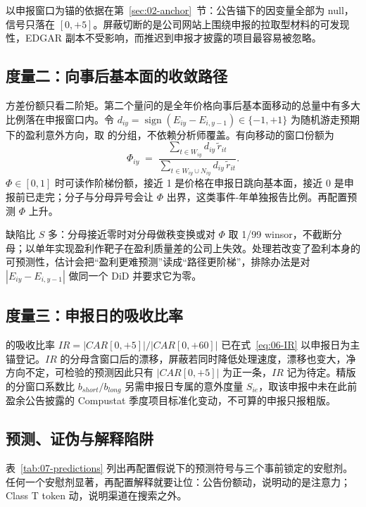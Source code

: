 \documentclass[a4paper,11pt]{ctexart}
\begin{document}
以申报窗口为锚的依据在第~\ref{sec:02-anchor}~节：公告锚下的因变量全部为 null，信号只落在 $[0,+5]$。屏蔽切断的是公司网站上围绕申报的拉取型材料的可发现性，EDGAR 副本不受影响，而推迟到申报才披露的项目最容易被忽略\citep{linekrasovteoh2020}。

\subsection{度量二：向事后基本面的收敛路径}\label{sec:07-conv}

方差份额只看二阶矩。第二个量问的是全年价格向事后基本面移动的总量中有多大比例落在申报窗口内。令 $d_{iy}=\operatorname{sign}(E_{iy}-E_{i,y-1})\in\{-1,+1\}$ 为随机游走预期下的盈利意外方向，取 \citet{ballbrown1968} 的分组，不依赖分析师覆盖。有向移动的窗口份额为
\begin{equation}\label{eq:07-conv}
\Phi_{iy} \;=\; \frac{\sum_{t\in W_{iy}} d_{iy}\,\tilde r_{it}}{\sum_{t\in W_{iy}\cup N_{iy}} d_{iy}\,\tilde r_{it}} .
\end{equation}
$\Phi\in[0,1]$ 时可读作阶梯份额，接近 1 是价格在申报日跳向基本面，接近 0 是申报前已走完；分子与分母异号会让 $\Phi$ 出界，这类事件-年单独报告比例。再配置预测 $\Phi$ 上升。

缺陷比 $S$ 多：分母接近零时对分母做秩变换或对 $\Phi$ 取 1/99 winsor，不截断分母；以单年实现盈利作靶子在盈利质量差的公司上失效。处理若改变了盈利本身的可预测性，估计会把“盈利更难预测”读成“路径更阶梯”，排除办法是对 $|E_{iy}-E_{i,y-1}|$ 做同一个 DiD 并要求它为零。

\subsection{度量三：申报日的吸收比率}\label{sec:07-ir}

\citet{dellavignapollet2009} 的吸收比率 $IR=|CAR[0,+5]|/|CAR[0,+60]|$ 已在式~\eqref{eq:06-IR} 以申报日为主锚登记。$IR$ 的分母含窗口后的漂移，屏蔽若同时降低处理速度，漂移也变大，净方向不定，可检验的预测因此只有 $|CAR[0,+5]|$ 为正一条，$IR$ 记为待定。精版的分窗口系数比 $b_{short}/b_{long}$ 另需申报日专属的意外度量 $S_{ie}$，取该申报中未在此前盈余公告披露的 Compustat 季度项目标准化变动\citep{linekrasovteoh2020}，不可算的申报只报粗版。

\subsection{预测、证伪与解释陷阱}\label{sec:07-trap}

表~\ref{tab:07-predictions} 列出再配置假说下的预测符号与三个事前锁定的安慰剂。任何一个安慰剂显著，再配置解释就要让位：公告份额动，说明动的是注意力；Class T token 动，说明渠道在搜索之外。
\end{document}
